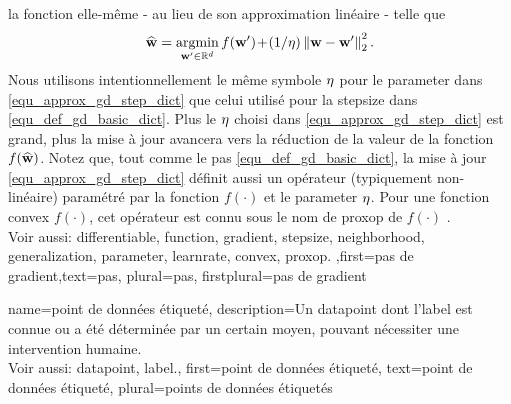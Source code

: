 {{		la fonction elle-même - au lieu de son approximation linéaire - telle que
		\begin{align} 
			\label{equ_approx_gd_step_dict}
			\widehat{{\bf w}} = \operatorname*{argmin}_{{\bf w}' \in \mathbb{R}^{d}} f({\bf w}')\!+\!(1/\eta)\left\Vert {{\bf w}-{\bf w}'} \right\Vert_{2}^2. 
		\end{align}
		Nous utilisons intentionnellement le même symbole $\eta$ pour le \gls{parameter} dans \eqref{equ_approx_gd_step_dict} 
		que celui utilisé pour la \gls{stepsize} dans \eqref{equ_def_gd_basic_dict}. Plus le $\eta$ choisi dans 
		\eqref{equ_approx_gd_step_dict} est grand, plus la mise à jour avancera vers la réduction de la 
		valeur de la fonction $f(\widehat{{\bf w}})$. Notez que, tout comme le pas \eqref{equ_def_gd_basic_dict}, 
		la mise à jour \eqref{equ_approx_gd_step_dict} définit aussi un opérateur (typiquement non-linéaire) 
		paramétré par la fonction $f(\cdot)$ et le \gls{parameter} $\eta$. Pour une fonction \gls{convex} 
		$f(\cdot)$, cet opérateur est connu sous le nom de \gls{proxop} de $f(\cdot)$ \cite{ProximalMethods}. 
		\\ 
		Voir aussi: \gls{differentiable}, \gls{function}, \gls{gradient}, \gls{stepsize}, \gls{neighborhood}, \gls{generalization}, \gls{parameter}, \gls{learnrate}, \gls{convex}, \gls{proxop}. 
	},first={pas de gradient},text={pas}, plural={pas}, firstplural={pas de gradient}}

 
 {
 	name={point de données étiqueté},
 	description={Un \gls{datapoint} dont l'\gls{label} est connue ou a été déterminée 
 		par un certain moyen, pouvant nécessiter une intervention humaine.
 		\\
 		Voir aussi: \gls{datapoint}, \gls{label}.},
 	first={point de données étiqueté},
 	text={point de données étiqueté}, plural={points de données étiquetés}  
 }


